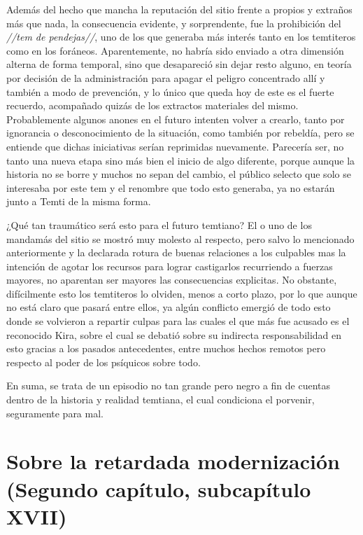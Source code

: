 \documentclass[
  spanish,
]{book}
\begin{document}
Además del hecho que mancha la reputación del sitio frente a propios y extraños más que nada, la consecuencia evidente, y sorprendente, fue la prohibición del \emph{//tem de pendejas//}, uno de los que generaba más interés tanto en los temtiteros como en los foráneos. Aparentemente, no habría sido enviado a otra dimensión alterna de forma temporal, sino que desapareció sin dejar resto alguno, en teoría por decisión de la administración para apagar el peligro concentrado allí y también a modo de prevención, y lo único que queda hoy de este es el fuerte recuerdo, acompañado quizás de los extractos materiales del mismo. Probablemente algunos anones en el futuro intenten volver a crearlo, tanto por ignorancia o desconocimiento de la situación, como también por rebeldía, pero se entiende que dichas iniciativas serían reprimidas nuevamente. Parecería ser, no tanto una nueva etapa sino más bien el inicio de algo diferente, porque aunque la historia no se borre y muchos no sepan del cambio, el público selecto que solo se interesaba por este tem y el renombre que todo esto generaba, ya no estarán junto a Temti de la misma forma.

¿Qué tan traumático será esto para el futuro temtiano? El o uno de los mandamás del sitio se mostró muy molesto al respecto, pero salvo lo mencionado anteriormente y la declarada rotura de buenas relaciones a los culpables mas la intención de agotar los recursos para lograr castigarlos recurriendo a fuerzas mayores, no aparentan ser mayores las consecuencias explicitas. No obstante, difícilmente esto los temtiteros lo olviden, menos a corto plazo, por lo que aunque no está claro que pasará entre ellos, ya algún conflicto emergió de todo esto donde se volvieron a repartir culpas para las cuales el que más fue acusado es el reconocido Kira, sobre el cual se debatió sobre su indirecta responsabilidad en esto gracias a los pasados antecedentes, entre muchos hechos remotos pero respecto al poder de los psíquicos sobre todo.

En suma, se trata de un episodio no tan grande pero negro a fin de cuentas dentro de la historia y realidad temtiana, el cual condiciona el porvenir, seguramente para mal.

\hypertarget{sobre-la-retardada-modernizaciuxf3n-segundo-capuxedtulo-subcapuxedtulo-xvii}{%
\section{Sobre la retardada modernización (Segundo capítulo, subcapítulo XVII)}\label{sobre-la-retardada-modernizaciuxf3n-segundo-capuxedtulo-subcapuxedtulo-xvii}}
\end{document}
